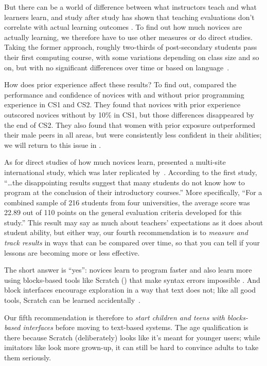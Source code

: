 But there can be a world of difference between what instructors teach and what learners learn, and study after study has shown that teaching evaluations don't correlate with actual learning outcomes \cite{Star2014,Uttl2017}. To find out how much novices are actually learning, we therefore have to use other measures or do direct studies. Taking the former approach, roughly two-thirds of post-secondary students pass their first computing course, with some variations depending on class size and so on, but with no significant differences over time or based on language~\cite{Benn2007a,Wats2014}.

How does prior experience affect these results? To find out, \cite{Wilc2018} compared the performance and confidence of novices with and without prior programming experience in CS1 and CS2. They found that novices with prior experience outscored novices without by 10\% in CS1, but those differences disappeared by the end of CS2. They also found that women with prior exposure outperformed their male peers in all areas, but were consistently less confident in their abilities; we will return to this issue in .

As for direct studies of how much novices learn, \cite{McCr2001} presented a multi-site international study, which was later replicated by~\cite{Utti2013}. According to the first study, ``{\ldots}the disappointing results suggest that many students do not know how to program at the conclusion of their introductory courses.'' More specifically, ``For a combined sample of 216 students from four universities, the average score was 22.89 out of 110 points on the general evaluation criteria developed for this study.'' This result may say as much about teachers' expectations as it does about student ability, but either way, our fourth recommendation is to \emph{measure and track results} in ways that can be compared over time, so that you can tell if your lessons are becoming more or less effective.


The short answer is ``yes'': novices learn to program faster and also learn more using blocks-based tools like Scratch () that make syntax errors impossible \cite{Wein2017b}. And block interfaces encourage exploration in a way that text does not; like all good tools, Scratch can be learned accidentally~\cite{Malo2010}.

Our fifth recommendation is therefore to \emph{start children and teens with blocks-based interfaces} before moving to text-based systems. The age qualification is there because Scratch (deliberately) looks like it's meant for younger users; while imitators like  look more grown-up, it can still be hard to convince adults to take them seriously.

